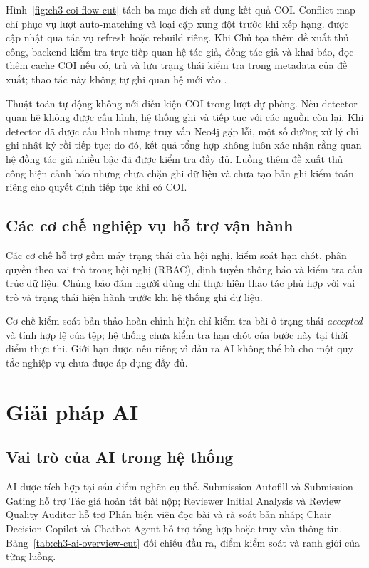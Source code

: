 Hình~\ref{fig:ch3-coi-flow-cut} tách ba mục đích sử dụng kết quả COI. Conflict map chỉ phục vụ lượt auto-matching và loại cặp xung đột trước khi xếp hạng.  được cập nhật qua tác vụ refresh hoặc rebuild riêng. Khi Chủ tọa thêm đề xuất thủ công, backend kiểm tra trực tiếp quan hệ tác giả, đồng tác giả và khai báo, đọc thêm cache COI nếu có, trả  và lưu trạng thái kiểm tra trong metadata của đề xuất; thao tác này không tự ghi quan hệ mới vào .

Thuật toán tự động không nới điều kiện COI trong lượt dự phòng. Nếu detector quan hệ không được cấu hình, hệ thống ghi  và tiếp tục với các nguồn còn lại. Khi detector đã được cấu hình nhưng truy vấn Neo4j gặp lỗi, một số đường xử lý chỉ ghi nhật ký rồi tiếp tục; do đó, kết quả tổng hợp không luôn xác nhận rằng quan hệ đồng tác giả nhiều bậc đã được kiểm tra đầy đủ. Luồng thêm đề xuất thủ công hiện cảnh báo nhưng chưa chặn ghi dữ liệu và chưa tạo bản ghi kiểm toán riêng cho quyết định tiếp tục khi có COI.

\subsection{Các cơ chế nghiệp vụ hỗ trợ vận hành}
\label{subsec:ch3-operations-cut}

Các cơ chế hỗ trợ gồm máy trạng thái của hội nghị, kiểm soát hạn chót, phân quyền theo vai trò trong hội nghị (RBAC), định tuyến thông báo và kiểm tra cấu trúc dữ liệu. Chúng bảo đảm người dùng chỉ thực hiện thao tác phù hợp với vai trò và trạng thái hiện hành trước khi hệ thống ghi dữ liệu.

Cơ chế kiểm soát bản thảo hoàn chỉnh hiện chỉ kiểm tra bài ở trạng thái \textit{accepted} và tính hợp lệ của tệp; hệ thống chưa kiểm tra hạn chót của bước này tại thời điểm thực thi. Giới hạn được nêu riêng vì đầu ra AI không thể bù cho một quy tắc nghiệp vụ chưa được áp dụng đầy đủ.

\section{Giải pháp AI}

\subsection{Vai trò của AI trong hệ thống}

AI được tích hợp tại sáu điểm nghẽn cụ thể. Submission Autofill và Submission Gating hỗ trợ Tác giả hoàn tất bài nộp; Reviewer Initial Analysis và Review Quality Auditor hỗ trợ Phản biện viên đọc bài và rà soát bản nháp; Chair Decision Copilot và Chatbot Agent hỗ trợ tổng hợp hoặc truy vấn thông tin. Bảng~\ref{tab:ch3-ai-overview-cut} đối chiếu đầu ra, điểm kiểm soát và ranh giới của từng luồng.

